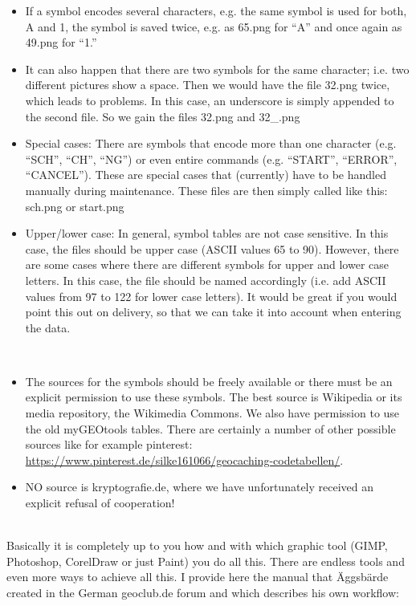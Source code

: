 \begin{description}
\begin{itemize}
        \item If a symbol encodes several characters, e.g. the same symbol is used for both, A and 1, the symbol is saved twice, e.g. as 65.png for \enquote{A} and once again as 49.png for \enquote{1.}
        \item It can also happen that there are two symbols for the same character; i.e. two different pictures show a space. Then we would have the file 32.png twice, which leads to problems. In this case, an underscore is simply appended to the second file. So we gain the files 32.png and 32\_.png
        \item Special cases: There are symbols that encode more than one character (e.g. “SCH”, “CH”, “NG”) or even entire commands (e.g. “START”, “ERROR”, “CANCEL”). These are special cases that (currently) have to be handled manually during maintenance. These files are then simply called like this: sch.png or start.png
        \item Upper/lower case: In general, symbol tables are not case sensitive. In this case, the files should be upper case (ASCII values 65 to 90). However, there are some cases where there are different symbols for upper and lower case letters. In this case, the file should be named accordingly (i.e. add ASCII values from 97 to 122 for lower case letters). It would be great if you would point this out on delivery, so that we can take it into account when entering the data.
    \end{itemize}
    \item [Sources for the pictures] \,
        \begin{itemize}
            \item The sources for the symbols should be freely available or there must be an explicit permission to use these symbols. The best source is Wikipedia or its media repository, the Wikimedia Commons. We also have permission to use the old myGEOtools tables. There are certainly a number of other possible sources like for example pinterest: \url{https://www.pinterest.de/silke161066/geocaching-codetabellen/}.   
            \item NO source is kryptografie.de, where we have unfortunately received an explicit refusal of cooperation!
        \end{itemize}
    \item [The workflow for creation] \,\\
         Basically it is completely up to you how and with which graphic tool (GIMP, Photoshop, CorelDraw or just Paint) you do all this. There are endless tools and even more ways to achieve all this. I provide here the manual that Äggsbärde created in the German geoclub.de forum and which describes his own workflow:

\end{description}
